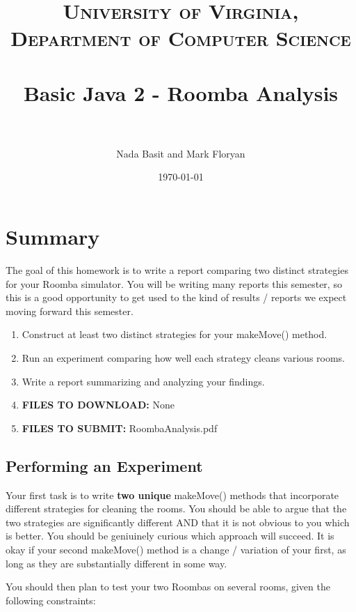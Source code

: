 \documentclass[paper=a4, fontsize=11pt, parskip=full]{scrartcl} %
\title{
\normalfont \normalsize
\textsc{University of Virginia, Department of Computer Science} \\ [25pt] %
\horrule{0.5pt} \\[0.4cm] %
\huge Basic Java 2 - Roomba Analysis \\ %
\horrule{2pt} \\[0.5cm] %
}
\author{Nada Basit and Mark Floryan}
\date{\normalsize\today} %
\numberwithin{equation}{section} %
\numberwithin{figure}{section} %
\numberwithin{table}{section} %
\begin{document}
\maketitle %



\section{Summary}

The goal of this homework is to write a report comparing two distinct strategies for your Roomba simulator. You will be writing many reports this semester, so this is a good opportunity to get used to the kind of results / reports we expect moving forward this semester.

\begin{enumerate}
	\item Construct at least two distinct strategies for your makeMove() method.
	\item Run an experiment comparing how well each strategy cleans various rooms.
	\item Write a report summarizing and analyzing your findings.
	\item \textbf{FILES TO DOWNLOAD:} None
	\item \textbf{FILES TO SUBMIT:} RoombaAnalysis.pdf
\end{enumerate}

\subsection{Performing an Experiment}

Your first task is to write \textbf{two unique} makeMove() methods that incorporate different strategies for cleaning the rooms. You should be able to argue that the two strategies are significantly different AND that it is not obvious to you which is better. You should be geniuinely curious which approach will succeed. It is okay if your second makeMove() method is a change / variation of your first, as long as they are substantially different in some way.

You should then plan to test your two Roombas on several rooms, given the following constraints:
\end{document}
